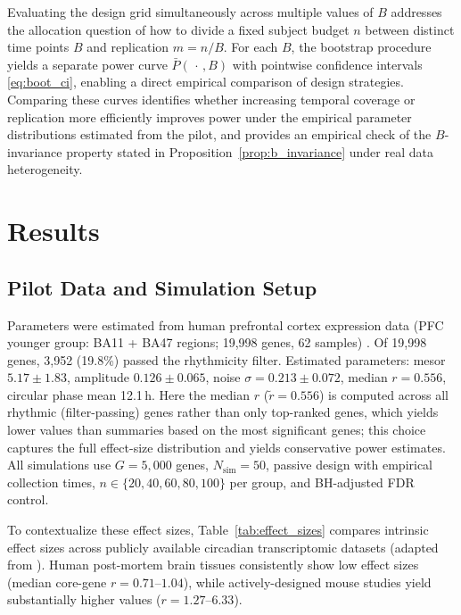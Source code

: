 \documentclass{article}
\begin{document}
Evaluating the design grid simultaneously across multiple values of $B$
addresses the allocation question of how to divide a fixed subject budget $n$
between distinct time points $B$ and replication $m=n/B$. For each $B$, the
bootstrap procedure yields a separate power curve $\bar{P}(\,\cdot\,,B)$ with
pointwise confidence intervals \eqref{eq:boot_ci}, enabling a direct empirical
comparison of design strategies. Comparing these curves identifies whether
increasing temporal coverage or replication more efficiently improves power
under the empirical parameter distributions estimated from the pilot, and
provides an empirical check of the $B$-invariance property stated in
Proposition~\ref{prop:b_invariance} under real data heterogeneity.


\section{Results}

\subsection{Pilot Data and Simulation Setup}

Parameters were estimated from human prefrontal cortex expression data (PFC younger group: BA11 + BA47 regions; 19,998 genes, 62 samples) \cite{chen2016aging}. Of 19,998 genes, 3,952 (19.8\%) passed the rhythmicity filter. Estimated parameters: mesor $5.17 \pm 1.83$, amplitude $0.126 \pm 0.065$, noise $\sigma = 0.213 \pm 0.072$, median $r = 0.556$, circular phase mean 12.1\,h. Here the median $r$ ($\tilde{r} = 0.556$) is computed across all rhythmic (filter-passing) genes rather than only top-ranked genes, which yields lower values than summaries based on the most significant genes; this choice captures the full effect-size distribution and yields conservative power estimates. All simulations use $G = 5{,}000$ genes, $N_{\text{sim}} = 50$, passive design with empirical collection times, $n \in \{20, 40, 60, 80, 100\}$ per group, and BH-adjusted FDR control.

To contextualize these effect sizes, Table~\ref{tab:effect_sizes} compares intrinsic effect sizes across publicly available circadian transcriptomic datasets (adapted from \cite{zong2023circapower}). Human post-mortem brain tissues consistently show low effect sizes (median core-gene $r = 0.71$--$1.04$), while actively-designed mouse studies yield substantially higher values ($r = 1.27$--$6.33$). 
\end{document}
